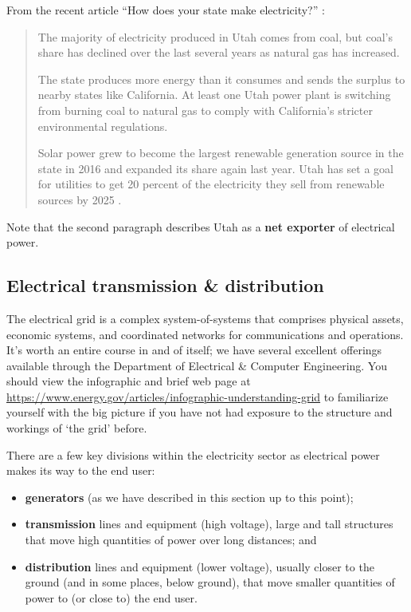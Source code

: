 \documentclass[10pt]{article}
\begin{document}
From the recent article ``How does your state make electricity?'' \cite{Popovich2018}:

\begin{quote}

The majority of electricity produced in Utah comes from coal, but coal's share has declined over the last several years as natural gas has increased.

The state produces more energy than it consumes and sends the surplus to nearby states like California. At least one Utah power plant \cite{Linthicum2013} is switching from burning coal to natural gas to comply with California's stricter environmental regulations.

Solar power grew to become the largest renewable generation source in the state in 2016 \cite{brightfuture} and expanded its share again last year. Utah has set a goal for utilities to get 20 percent of the electricity they sell from renewable sources by 2025 \cite{noauthor_undated-xb}.

\end{quote}

Note that the second paragraph describes Utah as a \textbf{net exporter} of electrical power.


\subsection{Electrical transmission \& distribution}

The electrical grid is a complex system-of-systems that comprises physical assets, economic systems, and coordinated networks for communications and operations. It's worth an entire course in and of itself; we have several excellent offerings available through the Department of Electrical \& Computer Engineering. You should view the infographic and brief web page at \url{https://www.energy.gov/articles/infographic-understanding-grid} to familiarize yourself with the big picture if you have not had exposure to the structure and workings of `the grid' before.

There are a few key divisions within the electricity sector as electrical power makes its way to the end user: 

\begin{itemize}
    \item \textbf{generators} (as we have described in this section up to this point);
    \item \textbf{transmission} lines and equipment (high voltage), large and tall structures that move high quantities of power over long distances; and
    \item \textbf{distribution} lines and equipment (lower voltage), usually closer to the ground (and in some places, below ground), that move smaller quantities of power to (or close to) the end user.
\end{itemize}
\end{document}

